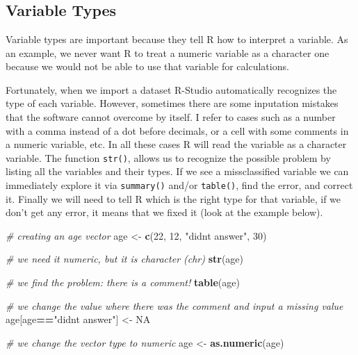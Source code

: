 \documentclass[
]{article}
\newenvironment{Shaded}{\begin{snugshade}}{\end{snugshade}}
\newcommand{\CommentTok}[1]{\textcolor[rgb]{0.56,0.35,0.01}{\textit{#1}}}
\newcommand{\ConstantTok}[1]{\textcolor[rgb]{0.56,0.35,0.01}{#1}}
\newcommand{\DecValTok}[1]{\textcolor[rgb]{0.00,0.00,0.81}{#1}}
\newcommand{\FunctionTok}[1]{\textcolor[rgb]{0.13,0.29,0.53}{\textbf{#1}}}
\newcommand{\NormalTok}[1]{#1}
\newcommand{\OtherTok}[1]{\textcolor[rgb]{0.56,0.35,0.01}{#1}}
\newcommand{\SpecialCharTok}[1]{\textcolor[rgb]{0.81,0.36,0.00}{\textbf{#1}}}
\newcommand{\StringTok}[1]{\textcolor[rgb]{0.31,0.60,0.02}{#1}}
\begin{document}
~

~

~

\hypertarget{variable-types}{%
\subsection{Variable Types}\label{variable-types}}

Variable types are important because they tell R how to interpret a
variable. As an example, we never want R to treat a numeric variable as
a character one because we would not be able to use that variable for
calculations.

Fortunately, when we import a dataset R-Studio automatically recognizes
the type of each variable. However, sometimes there are some inputation
mistakes that the software cannot overcome by itself. I refer to cases
such as a number with a comma instead of a dot before decimals, or a
cell with some comments in a numeric variable, etc. In all these cases R
will read the variable as a character variable. The function \texttt{str()},
allows us to recognize the possible problem by listing all the variables
and their types. If we see a missclassified variable we can immediately
explore it via \texttt{summary()} and/or \texttt{table()}, find the error, and correct
it. Finally we will need to tell R which is the right type for that
variable, if we don't get any error, it means that we fixed it (look at
the example below).

\begin{Shaded}
\begin{Highlighting}[]
\CommentTok{\# creating an age vector}
\NormalTok{age }\OtherTok{\textless{}{-}} \FunctionTok{c}\NormalTok{(}\DecValTok{22}\NormalTok{, }\DecValTok{12}\NormalTok{, }\StringTok{"didn\textquotesingle{}t answer"}\NormalTok{, }\DecValTok{30}\NormalTok{)}

\CommentTok{\# we need it numeric, but it is character (chr)}
\FunctionTok{str}\NormalTok{(age)}

\CommentTok{\# we find the problem: there is a comment!}
\FunctionTok{table}\NormalTok{(age)}

\CommentTok{\# we change the value where there was the comment and input a missing value}
\NormalTok{age[age}\SpecialCharTok{==}\StringTok{"didn\textquotesingle{}t answer"}\NormalTok{] }\OtherTok{\textless{}{-}} \ConstantTok{NA}

\CommentTok{\# we change the vector type to numeric}
\NormalTok{age }\OtherTok{\textless{}{-}} \FunctionTok{as.numeric}\NormalTok{(age)}
\end{Highlighting}
\end{Shaded}
\end{document}
